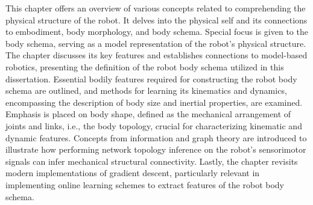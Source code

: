 This chapter offers an overview of various concepts related to comprehending the physical structure of the robot. It delves into the physical self and its connections to embodiment, body morphology, and body schema. Special focus is given to the body schema, serving as a model representation of the robot's physical structure. The chapter discusses its key features and establishes connections to model-based robotics, presenting the definition of the robot body schema utilized in this dissertation. Essential bodily features required for constructing the robot body schema are outlined, and methods for learning its kinematics and dynamics, encompassing the description of body size and inertial properties, are examined. Emphasis is placed on body shape, defined as the mechanical arrangement of joints and links, i.e., the body topology, crucial for characterizing kinematic and dynamic features. Concepts from information and graph theory are introduced to illustrate how performing network topology inference on the robot's sensorimotor signals can infer mechanical structural connectivity. Lastly, the chapter revisits modern implementations of gradient descent, particularly relevant in implementing online learning schemes to extract features of the robot body schema.

